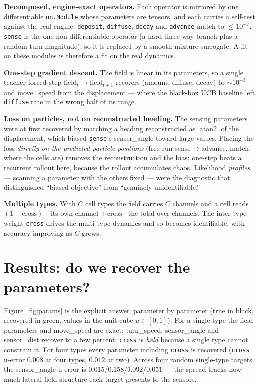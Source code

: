 \documentclass[11pt]{article}
\newcommand{\code}[1]{\texttt{#1}}
\newcommand{\op}[1]{\textcolor{cop}{\texttt{#1}}}
\begin{document}
\textbf{Decomposed, engine-exact operators.} Each operator is mirrored by one
differentiable \code{nn.Module} whose parameters are tensors, and each carries a
self-test against the real engine: \op{deposit}, \op{diffuse}, \op{decay} and
\op{advance} match to $\le 10^{-7}$. \op{sense} is the one non-differentiable operator
(a hard three-way branch plus a random turn magnitude), so it is replaced by a smooth
mixture surrogate. A fit on these modules is therefore a fit on the real dynamics.

\textbf{One-step gradient descent.} The field is linear in its parameters, so a
single teacher-forced step $\text{field}_{t}\!\to\!\text{field}_{t+1}$ recovers
(amount, diffuse, decay) to $\sim\!10^{-3}$ and move\_speed from the displacement ---
where the black-box UCB baseline left \op{diffuse}.rate in the wrong half of its range.

\textbf{Loss on particles, not on reconstructed heading.} The sensing parameters were
at first recovered by matching a heading reconstructed as $\operatorname{atan2}$ of the
displacement, which biased \op{sense}'s sensor\_angle toward large values. Placing the
loss \emph{directly on the predicted particle positions} (free-run sense$\to$advance,
match where the cells are) removes the reconstruction and the bias; one-step beats a
recurrent rollout here, because the rollout accumulates chaos. Likelihood
\emph{profiles} --- scanning a parameter with the others fixed --- were the diagnostic
that distinguished ``biased objective'' from ``genuinely unidentifiable.''

\textbf{Multiple types.} With $C$ cell types the field carries $C$ channels and a cell
reads $(1-\text{cross})\,\cdot$ its own channel $+\,\text{cross}\cdot$ the total over
channels. The inter-type weight \op{cross} drives the multi-type dynamics and so
becomes identifiable, with accuracy improving as $C$ grows.

\section{Results: do we recover the parameters?}

Figure~\ref{fig:params} is the explicit answer, parameter by parameter (true in black,
recovered in green, values in the unit cube $u\in[0,1]$). For a single type the field
parameters and move\_speed are exact; turn\_speed, sensor\_angle and sensor\_dist
recover to a few percent; \op{cross} is \emph{held} because a single type cannot
constrain it. For four types every parameter including \op{cross} is recovered
(\op{cross} u-error $0.008$ at four types, $0.012$ at two). Across four random
single-type targets the sensor\_angle u-error is $0.015$/$0.158$/$0.092$/$0.051$ ---
the spread tracks how much lateral field structure each target presents to the sensors.
\end{document}
